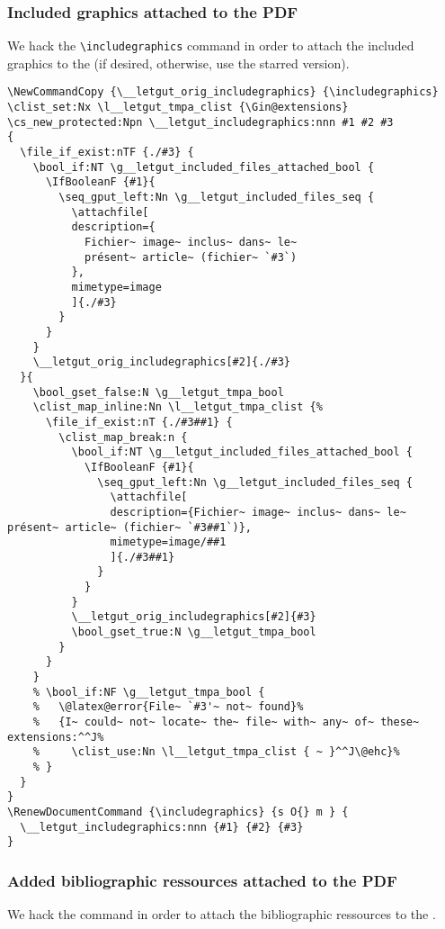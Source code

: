 \documentclass{letgut}
\begin{document}
\subsubsection{Included graphics attached to the PDF}
\label{ImplementationMiscellanousIncludedgraphicsattachedtothePDF-xoc34ja00pj0}
We hack the \lstinline+\includegraphics+ command in order to attach the included graphics
to the \pdf{} (if desired, otherwise, use the starred version).

\begin{lstlisting}
\NewCommandCopy {\__letgut_orig_includegraphics} {\includegraphics}
\clist_set:Nx \l__letgut_tmpa_clist {\Gin@extensions}
\cs_new_protected:Npn \__letgut_includegraphics:nnn #1 #2 #3
{
  \file_if_exist:nTF {./#3} {
    \bool_if:NT \g__letgut_included_files_attached_bool {
      \IfBooleanF {#1}{
        \seq_gput_left:Nn \g__letgut_included_files_seq {
          \attachfile[
          description={
            Fichier~ image~ inclus~ dans~ le~
            présent~ article~ (fichier~ `#3`)
          },
          mimetype=image
          ]{./#3}
        }
      }
    }
    \__letgut_orig_includegraphics[#2]{./#3}
  }{
    \bool_gset_false:N \g__letgut_tmpa_bool
    \clist_map_inline:Nn \l__letgut_tmpa_clist {%
      \file_if_exist:nT {./#3##1} {
        \clist_map_break:n {
          \bool_if:NT \g__letgut_included_files_attached_bool {
            \IfBooleanF {#1}{
              \seq_gput_left:Nn \g__letgut_included_files_seq {
                \attachfile[
                description={Fichier~ image~ inclus~ dans~ le~ présent~ article~ (fichier~ `#3##1`)},
                mimetype=image/##1
                ]{./#3##1}
              }
            }
          }
          \__letgut_orig_includegraphics[#2]{#3}
          \bool_gset_true:N \g__letgut_tmpa_bool
        }
      }
    }
    % \bool_if:NF \g__letgut_tmpa_bool {
    %   \@latex@error{File~ `#3'~ not~ found}%
    %   {I~ could~ not~ locate~ the~ file~ with~ any~ of~ these~ extensions:^^J%
    %     \clist_use:Nn \l__letgut_tmpa_clist { ~ }^^J\@ehc}%
    % }
  }
}
\RenewDocumentCommand {\includegraphics} {s O{} m } {
  \__letgut_includegraphics:nnn {#1} {#2} {#3}
}
\end{lstlisting}

\subsubsection{Added bibliographic ressources attached to the PDF}
\label{ImplementationMiscellanousAddedbibliographicressourcesattachedtothePDF-l4e34ja00pj0}
We hack the \lstinline++ command in order to attach the bibliographic
ressources to the \pdf{}.
\end{document}
